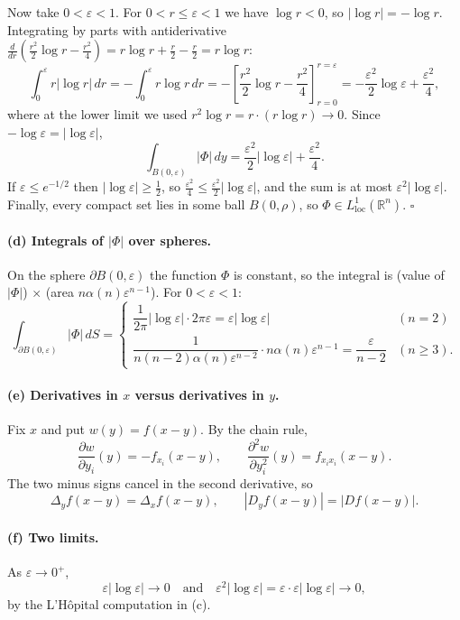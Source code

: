 \documentclass[11pt]{article}
\theoremstyle{plain}
\theoremstyle{definition}
\theoremstyle{remark}
\begin{document}
Now take $0 < \varepsilon < 1$. For $0 < r \leq \varepsilon < 1$ we have $\log r < 0$, so $|\log r| = -\log r$. Integrating by parts with antiderivative $\frac{d}{dr}\left(\frac{r^2}{2}\log r - \frac{r^2}{4}\right) = r\log r + \frac{r}{2} - \frac{r}{2} = r\log r$:
$$ \int_0^\varepsilon r|\log r|\, dr = -\int_0^\varepsilon r\log r\, dr = -\left[\frac{r^2}{2}\log r - \frac{r^2}{4}\right]_{r=0}^{r=\varepsilon} = -\frac{\varepsilon^2}{2}\log\varepsilon + \frac{\varepsilon^2}{4}, $$
where at the lower limit we used $r^2 \log r = r\cdot(r\log r) \to 0$. Since $-\log \varepsilon = |\log\varepsilon|$,
$$ \int_{B(0,\varepsilon)} |\Phi|\, dy = \frac{\varepsilon^2}{2}|\log \varepsilon| + \frac{\varepsilon^2}{4}. $$
If $\varepsilon \leq e^{-1/2}$ then $|\log\varepsilon| \geq \frac12$, so $\frac{\varepsilon^2}{4} \leq \frac{\varepsilon^2}{2}|\log\varepsilon|$, and the sum is at most $\varepsilon^2|\log\varepsilon|$. Finally, every compact set lies in some ball $B(0,\rho)$, so $\Phi \in L^1_{\mathrm{loc}}(\mathbb{R}^n)$. $\square$

\paragraph{(d) Integrals of $|\Phi|$ over spheres.} On the sphere $\partial B(0,\varepsilon)$ the function $\Phi$ is constant, so the integral is (value of $|\Phi|$) $\times$ (area $n\alpha(n)\varepsilon^{n-1}$). For $0 < \varepsilon < 1$:
$$ \int_{\partial B(0,\varepsilon)} |\Phi|\, dS = \begin{cases} \dfrac{1}{2\pi}|\log\varepsilon| \cdot 2\pi\varepsilon = \varepsilon|\log\varepsilon| & (n=2) \\[1em] \dfrac{1}{n(n-2)\alpha(n)\varepsilon^{n-2}} \cdot n\alpha(n)\varepsilon^{n-1} = \dfrac{\varepsilon}{n-2} & (n\geq 3). \end{cases} $$

\paragraph{(e) Derivatives in $x$ versus derivatives in $y$.} Fix $x$ and put $w(y) = f(x-y)$. By the chain rule,
$$ \frac{\partial w}{\partial y_i}(y) = -f_{x_i}(x-y), \qquad \frac{\partial^2 w}{\partial y_i^2}(y) = f_{x_i x_i}(x-y). $$
The two minus signs cancel in the second derivative, so
$$ \Delta_y f(x-y) = \Delta_x f(x-y), \qquad |D_y f(x-y)| = |Df(x-y)|. $$

\paragraph{(f) Two limits.} As $\varepsilon \to 0^+$,
$$ \varepsilon|\log\varepsilon| \to 0 \quad\text{and}\quad \varepsilon^2|\log\varepsilon| = \varepsilon \cdot \varepsilon|\log \varepsilon| \to 0, $$
by the L'H\^opital computation in (c).
\end{document}
